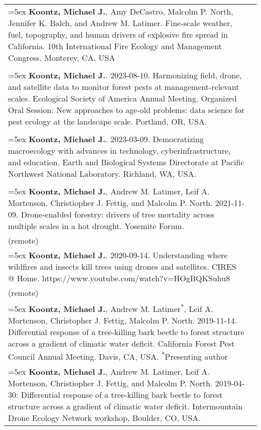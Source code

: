 \begin{longtable}{@{}>{\raggedright}p{5.25in} @{} >{\raggedleft}X@{}}

\hangindent=5ex \textbf{Koontz, Michael J.}, Amy DeCastro, Malcolm P. North, Jennifer K. Balch, and Andrew M. Latimer. Fine-scale weather, fuel, topography, and human drivers of explosive fire spread in California. 10th International Fire Ecology and Management Congress. Monterey, CA, USA & 2023 \\ \tabularnewline

\hangindent=5ex \textbf{Koontz, Michael J.}. 2023-08-10. Harmonizing field, drone, and satellite data to monitor forest pests at management-relevant scales. Ecological Society of America Annual Meeting. Organized Oral Session: New approaches to age-old problems: data science for pest ecology at the landscape scale. Portland, OR, USA. & 2023 \\  \tabularnewline

\hangindent=5ex \textbf{Koontz, Michael J.}. 2023-03-09. Democratizing macroecology with advances in technology, cyberinfrastructure, and education. Earth and Biological Systems Directorate at Pacific Northwest National Laboratory. Richland, WA, USA. & 2023 \\  \tabularnewline

\hangindent=5ex \textbf{Koontz, Michael J.}, Andrew M. Latimer, Leif A. Mortenson, Christiopher J. Fettig, and Malcolm P. North. 2021-11-09. Drone-enabled forestry: drivers of tree mortality across multiple scales in a hot drought. Yosemite Forum. & 2021 \\ (remote) \tabularnewline

\hangindent=5ex \textbf{Koontz, Michael J.}. 2020-09-14. Understanding where wildfires and insects kill trees using drones and satellites. CIRES @ Home. https://www.youtube.com/watch?v=HOgBQKSuhu8 & 2020 \\ (remote) \tabularnewline

\hangindent=5ex \textbf{Koontz, Michael J.}, Andrew M. Latimer\textsuperscript{*}, Leif A. Mortenson, Christopher J. Fettig, Malcolm P. North. 2019-11-14. Differential response of a tree-killing bark beetle to forest structure across a gradient of climatic water deficit. California Forest Pest Council Annual Meeting. Davis, CA, USA. \newline \textsuperscript{*}Presenting author & 2019 \tabularnewline

\hangindent=5ex \textbf{Koontz, Michael J.}, Andrew M. Latimer, Leif A. Mortenson, Christiopher J. Fettig, and Malcolm P. North. 2019-04-30: Differential response of a tree-killing bark beetle to forest structure across a gradient of climatic water deficit. Intermountain Drone Ecology Network workshop, Boulder, CO, USA. & 2019 \tabularnewline


\end{longtable}
